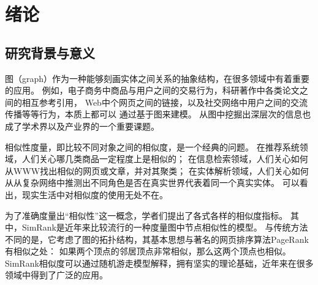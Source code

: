 \documentclass[master]{njuthesis}
\begin{document}
%

\tableofcontents



\mainmatter

\chapter{绪论}\label{chapter_introduction}
\section{研究背景与意义}
图（graph）作为一种能够刻画实体之间关系的抽象结构，在很多领域中有着重要的应用。
例如，电子商务中商品与用户之间的交易行为，科研著作中各类论文之间的相互参考引用，
Web中个网页之间的链接，以及社交网络中用户之间的交流传播等等行为，本质上都可以
通过基于图来建模。 从图中挖掘出深层次的信息也成了学术界以及产业界的一个重要课题。

相似性度量，即比较不同对象之间的相似度，是一个经典的问题。
在推荐系统\cite{fouss2007random}领域，人们关心哪几类商品一定程度上是相似的；
在信息检索\cite{dean1999finding}领域，人们关心如何从WWW找出相似的网页或文章，并对其聚类；
在实体解析\cite{bhattacharya2006entity}领域，人们关心如何从从复杂网络中推测出不同角色是否在真实世界代表着同一个真实实体。
可以看出，现实生活中对相似度的使用无处不在。

为了准确度量出“相似性”这一概念，学者们提出了各式各样的相似度指标。
其中，SimRank\cite{jeh2002simrank}是近年来比较流行的一种度量图中节点相似性的模型。
与传统方法不同的是，它考虑了图的拓扑结构，其基本思想与著名的网页排序算法PageRank\cite{page1999pagerank}有相似之处：
如果两个顶点的邻居顶点非常相似，那么这两个顶点也相似。
SimRank相似度可以通过随机游走模型解释，拥有坚实的理论基础，近年来在很多领域中得到了广泛的应用。
\end{document}
